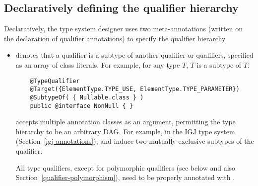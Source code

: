 \subsection{Declaratively defining the qualifier hierarchy\label{declarative-hierarchy}}

Declaratively, the type system designer uses two meta-annotations (written
on the declaration of qualifier annotations) to specify the qualifier
hierarchy.

\begin{itemize}

\item {} denotes that a qualifier is a subtype of
  another qualifier or qualifiers, specified as an array of class
  literals.  For example, for any type $T$,
   $T$ is a subtype of  $T$:

  \begin{Verbatim}
    @TypeQualifier
    @Target({ElementType.TYPE_USE, ElementType.TYPE_PARAMETER})
    @SubtypeOf( { Nullable.class } )
    public @interface NonNull { }
  \end{Verbatim}



   accepts multiple annotation classes as an argument,
  permitting the type hierarchy to be an arbitrary DAG\@.  For example,
  in the IGJ type system (Section~\ref{igj-annotations}), 
  and  induce two mutually exclusive subtypes of the
   qualifier.


  All type qualifiers, except for polymorphic qualifiers (see below and
  also Section~\ref{qualifier-polymorphism}), need to be
  properly annotated with .


\end{itemize}
